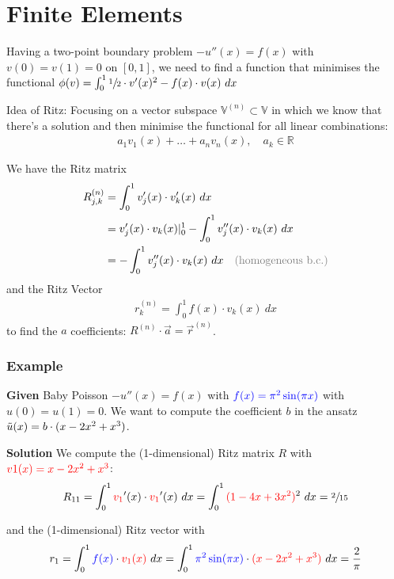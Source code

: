 \section{Finite Elements}


Having a two-point boundary problem $-u''(x) = f(x)$ with $v(0)=v(1)=0$ on $[0,1]$, we need to find a function
that minimises the functional $\phi(v) = \int_0^1\sfrac{1}{2}\cdot v'(x)^2-f(x)\cdot v(x)\ dx$

Idea of Ritz: Focusing on a vector subspace $\mathbb{V}^{(n)}\subset \mathbb{V}$ in which we know
that there's a solution and then minimise the functional for all linear combinations:
\begin{align*}
    a_1v_1(x)+\ldots+a_nv_n(x),\quad a_k\in\mathbb{R}
\end{align*}

We have the Ritz matrix
\begin{align*}
    R_{j,k}^{(n)} & = \int_0^1 v_j'(x)\cdot v_k'(x)\ dx \\
    & = v_j'(x)\cdot v_k(x)|_0^1 - \int_0^1 v_j''(x)\cdot v_k(x)\ dx \\
    & = - \int_0^1 v_j''(x)\cdot v_k(x)\ dx\quad\text{\color{gray} (homogeneous b.c.)}
\end{align*}
and the Ritz Vector
\begin{align*}
    r_k^{(n)} = \int_0^1 f(x)\cdot v_k(x)\ dx
\end{align*}
to find the $a$ coefficients: $R^{(n)}\cdot\vec{a} = \vec{r}^{(n)}$.

\subsubsection{Example}

\textbf{Given} Baby Poisson $-u''(x) = f(x)$ with ${\color{blue}f(x) = \pi^2\sin(\pi x)}$ with $u(0) = u(1) = 0$.
We want to compute the coefficient $b$ in the ansatz $\tilde{u}(x) = b\cdot(x - 2x^2 + x^3)$.

\textbf{Solution} We compute the (1-dimensional) Ritz matrix $R$ with
${\color{red} v1(x) = x - 2x^2 + x^3}$:
\begin{align*}
    R_{11} = \int_0^1 {\color{red}v_1}'(x)\cdot {\color{red}v_1}'(x)\ dx = \int_0^1 {\color{red}(1-4x+3x^2)}^2\ dx = \sfrac{2}{15}
\end{align*}

and the (1-dimensional) Ritz vector with
\begin{align*}
    r_1=\int_0^1 {\color{blue} f(x)}\cdot {\color{red}v_1(x)}\ dx = \int_0^1 {\color{blue} \pi^2\sin(\pi x)}\cdot{\color{red}(x-2x^2+x^3)}\ dx = \frac{2}{\pi}
\end{align*}

